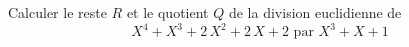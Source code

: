 Calculer le reste $R$ et le quotient $Q$ de la division euclidienne de
\begin{displaymath}
 {X}^{4}+{X}^{3}+2\,{X}^{2}+2\,X+2 \text{ par } X^3+X+1
\end{displaymath}
\bigskip \bigskip